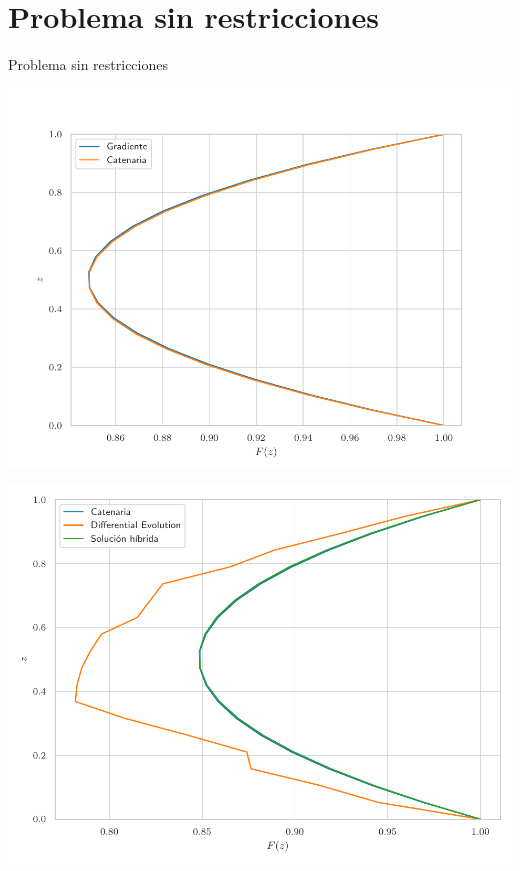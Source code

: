 \documentclass[11pt]{beamer}
\begin{document}
	\section{Problema sin restricciones}
		\begin{frame}{Problema sin restricciones}
			\justifying
			\begin{minipage}[b]{0.48\textwidth}
                    \centering
                    \includegraphics[height=0.5 \textheight]{Figuras/comp_grad_cat.pdf}
                \end{minipage}
                \hfill
                \begin{minipage}[b]{0.48\textwidth}
                    \centering
                    \includegraphics[height=0.5 \textheight]{Figuras/comp_de_cat.pdf}
                \end{minipage}
		\end{frame}
	
\end{document}
